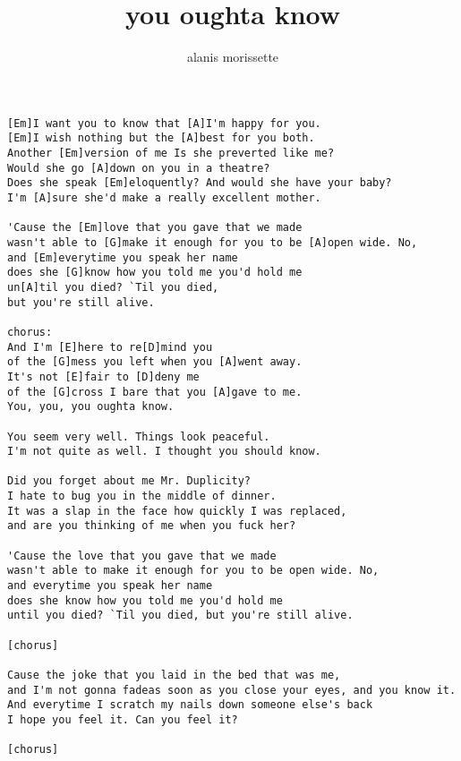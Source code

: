 \author{alanis morissette}
\title{you oughta know}
\maketitle
\begin{verbatim}
[Em]I want you to know that [A]I'm happy for you.
[Em]I wish nothing but the [A]best for you both.
Another [Em]version of me Is she preverted like me?
Would she go [A]down on you in a theatre?
Does she speak [Em]eloquently? And would she have your baby?
I'm [A]sure she'd make a really excellent mother.

'Cause the [Em]love that you gave that we made
wasn't able to [G]make it enough for you to be [A]open wide. No,
and [Em]everytime you speak her name
does she [G]know how you told me you'd hold me
un[A]til you died? `Til you died,
but you're still alive.

chorus:
And I'm [E]here to re[D]mind you
of the [G]mess you left when you [A]went away.
It's not [E]fair to [D]deny me
of the [G]cross I bare that you [A]gave to me.
You, you, you oughta know.

You seem very well. Things look peaceful.
I'm not quite as well. I thought you should know.
      
Did you forget about me Mr. Duplicity?
I hate to bug you in the middle of dinner.
It was a slap in the face how quickly I was replaced,
and are you thinking of me when you fuck her?

'Cause the love that you gave that we made
wasn't able to make it enough for you to be open wide. No,
and everytime you speak her name
does she know how you told me you'd hold me
until you died? `Til you died, but you're still alive.

[chorus]
              
Cause the joke that you laid in the bed that was me,
and I'm not gonna fadeas soon as you close your eyes, and you know it.
And everytime I scratch my nails down someone else's back
I hope you feel it. Can you feel it?

[chorus]
\end{verbatim}